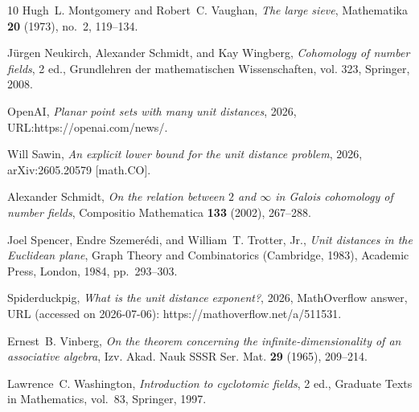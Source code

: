 \begin{thebibliography}{10}
Hugh~L. Montgomery and Robert~C. Vaughan, \emph{The large sieve}, Mathematika
  \textbf{20} (1973), no.~2, 119--134.

J{\"u}rgen Neukirch, Alexander Schmidt, and Kay Wingberg, \emph{Cohomology of
  number fields}, 2 ed., Grundlehren der mathematischen Wissenschaften, vol.
  323, Springer, 2008.

{OpenAI}, \emph{Planar point sets with many unit distances}, 2026,
  URL:https://openai.com/news/.

Will Sawin, \emph{An explicit lower bound for the unit distance problem}, 2026,
  arXiv:2605.20579 [math.CO].

Alexander Schmidt, \emph{On the relation between {$2$} and {$\infty$} in
  {Galois} cohomology of number fields}, Compositio Mathematica \textbf{133}
  (2002), 267--288.

Joel Spencer, Endre Szemer{\'e}di, and William~T. Trotter, Jr., \emph{Unit
  distances in the {Euclidean} plane}, Graph Theory and Combinatorics
  (Cambridge, 1983), Academic Press, London, 1984, pp.~293--303.

{Spiderduckpig}, \emph{What is the unit distance exponent?}, 2026, MathOverflow
  answer, URL (accessed on 2026-07-06): https://mathoverflow.net/a/511531.

Ernest~B. Vinberg, \emph{On the theorem concerning the infinite-dimensionality
  of an associative algebra}, Izv. Akad. Nauk SSSR Ser. Mat. \textbf{29}
  (1965), 209--214.

Lawrence~C. Washington, \emph{Introduction to cyclotomic fields}, 2 ed.,
  Graduate Texts in Mathematics, vol.~83, Springer, 1997.

\end{thebibliography}


